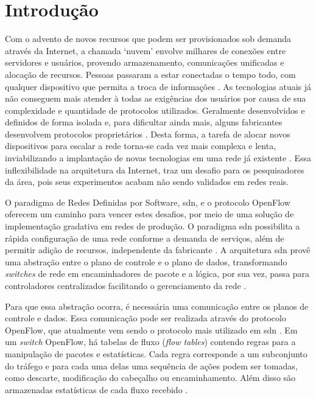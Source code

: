 \chapter{Introdução}
\label{sec:introducao}

Com o advento de novos recursos que podem ser provisionados sob demanda através da Internet, a chamada ‘nuvem’ envolve milhares de conexões entre servidores e usuários, provendo armazenamento, comunicações unificadas e alocação de recursos. Pessoas passaram a estar conectadas o tempo todo, com qualquer dispositivo que permita a troca de informações \cite{Seeber:2015}. As tecnologias atuais já não conseguem mais atender à todas as exigências dos usuários por causa de sua complexidade e quantidade de protocolos utilizados. Geralmente desenvolvidos e definidos de forma isolada e, para dificultar ainda mais, alguns fabricantes desenvolvem protocolos proprietários \cite{Kim:2013, Soares:2015}. Desta forma, a tarefa de alocar novos dispositivos para escalar a rede torna-se cada vez mais complexa e lenta, inviabilizando a implantação de novas tecnologias em uma rede já existente \cite{Kreutz:2014}. Essa inflexibilidade na arquitetura da Internet, traz um desafio para os pesquisadores da área, pois seus experimentos acabam não sendo validados em redes reais. 

O paradigma de Redes Definidas por Software, \gls{sdn}, e o protocolo OpenFlow \cite{OpenFlowSpec:2014} oferecem um caminho para vencer estes desafios, por meio de uma solução de implementação gradativa em redes de produção. O paradigma \gls{sdn} possibilita a rápida configuração de uma rede conforme a demanda de serviços, além de permitir adição de recursos, independente da fabricante \cite{Sayeed:2015}. A arquitetura \gls{sdn} provê uma abstração entre o plano de controle e o plano de dados, transformando \textit{switches} de rede em encaminhadores de pacote e a lógica, por sua vez, passa para controladores centralizados facilitando o gerenciamento da rede \cite{Kreutz:2013}. 

Para que essa abstração ocorra, é necessária uma comunicação entre os planos de controle e dados. Essa comunicação pode ser realizada através do protocolo OpenFlow, que atualmente vem sendo o protocolo mais utilizado em \gls{sdn} \cite{li:2016}. Em um \textit{switch} OpenFlow, há tabelas de fluxo (\textit{flow tables}) contendo regras para a manipulação de pacotes e estatísticas. Cada regra corresponde a um subconjunto do tráfego e para cada uma delas uma sequência de ações podem ser tomadas, como descarte, modificação do cabeçalho ou encaminhamento. Além disso são armazenadas estatísticas de cada fluxo recebido \cite{website:onf}.

